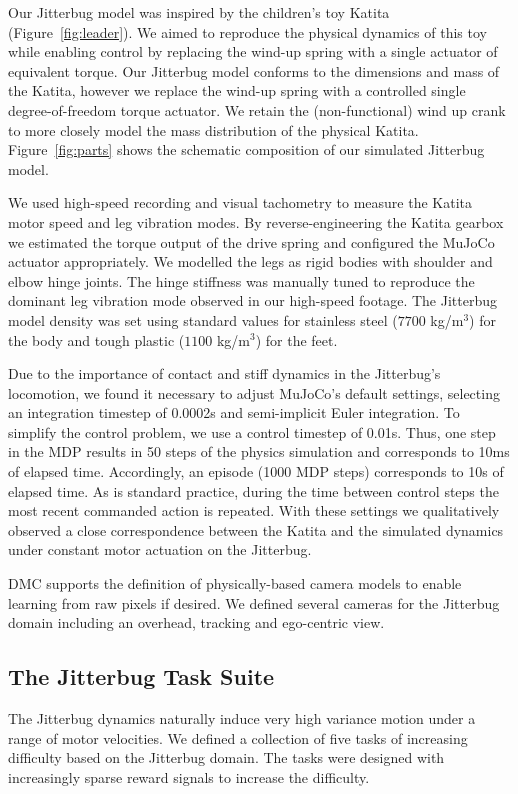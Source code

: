 \documentclass[letterpaper, 10 pt, conference]{ieeeconf}
\begin{document}
Our Jitterbug model was inspired by the children's toy Katita (Figure~\ref{fig:leader}).
We aimed to reproduce the physical dynamics of this toy while enabling control by replacing the wind-up spring with a single actuator of equivalent torque.
Our Jitterbug model conforms to the dimensions and mass of the Katita, however we replace the wind-up spring with a controlled single degree-of-freedom torque actuator.
We retain the (non-functional) wind up crank to more closely model the mass distribution of the physical Katita.
Figure~\ref{fig:parts} shows the schematic composition of our simulated Jitterbug model.

We used high-speed recording and visual tachometry to measure the Katita motor speed and leg vibration modes.
By reverse-engineering the Katita gearbox we estimated the torque output of the drive spring and configured the MuJoCo actuator appropriately.
We modelled the legs as rigid bodies with shoulder and elbow hinge joints.
The hinge stiffness was manually tuned to reproduce the dominant leg vibration mode observed in our high-speed footage.
The Jitterbug model density was set using standard values for stainless steel ($7700$ kg/m$^3$) for the body and tough plastic ($1100$ kg/m$^3$) for the feet.

Due to the importance of contact and stiff dynamics in the Jitterbug's locomotion, we found it necessary to adjust MuJoCo's default settings, selecting an integration timestep of 0.0002s and semi-implicit Euler integration.
To simplify the control problem, we use a control timestep of 0.01s.
Thus, one step in the MDP results in 50 steps of the physics simulation and corresponds to 10ms of elapsed time.
Accordingly, an episode (1000 MDP steps) corresponds to 10s of elapsed time.
As is standard practice, during the time between control steps the most recent commanded action is repeated.
With these settings we qualitatively observed a close correspondence between the Katita and the simulated dynamics under constant motor actuation on the Jitterbug.

DMC supports the definition of physically-based camera models to enable learning from raw pixels if desired.
We defined several cameras for the Jitterbug domain including an overhead, tracking and ego-centric view.

\subsection{The Jitterbug Task Suite}

The Jitterbug dynamics naturally induce very high variance motion under a range of motor velocities.
We defined a collection of five tasks of increasing difficulty based on the Jitterbug domain.
The tasks were designed with increasingly sparse reward signals to increase the difficulty.
\end{document}
